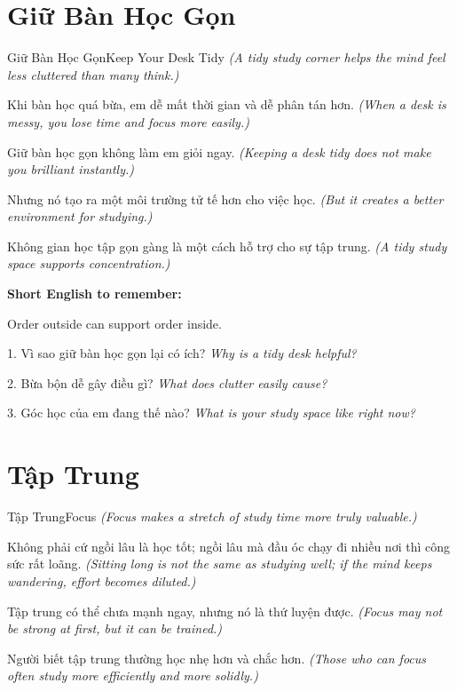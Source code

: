 \section{Giữ Bàn Học Gọn}
\begin{truyen}{Giữ Bàn Học Gọn}{Keep Your Desk Tidy}
\textit{(A tidy study corner helps the mind feel less cluttered than many think.)}

Khi bàn học quá bừa, em dễ mất thời gian và dễ phân tán hơn.
\textit{(When a desk is messy, you lose time and focus more easily.)}

Giữ bàn học gọn không làm em giỏi ngay.
\textit{(Keeping a desk tidy does not make you brilliant instantly.)}

Nhưng nó tạo ra một môi trường tử tế hơn cho việc học.
\textit{(But it creates a better environment for studying.)}
\end{truyen}

\begin{baihoc}
Không gian học tập gọn gàng là một cách hỗ trợ cho sự tập trung.
\textit{(A tidy study space supports concentration.)}
\end{baihoc}

\begin{ghinhoanh}
\textbf{Short English to remember:}

Order outside can support order inside.

\end{ghinhoanh}

\begin{tuhocnhanh}
1. Vì sao giữ bàn học gọn lại có ích? \textit{Why is a tidy desk helpful?}

2. Bừa bộn dễ gây điều gì? \textit{What does clutter easily cause?}

3. Góc học của em đang thế nào? \textit{What is your study space like right now?}
\end{tuhocnhanh}
\ngancach

\section{Tập Trung}
\begin{truyen}{Tập Trung}{Focus}
\textit{(Focus makes a stretch of study time more truly valuable.)}

Không phải cứ ngồi lâu là học tốt; ngồi lâu mà đầu óc chạy đi nhiều nơi thì công sức rất loãng.
\textit{(Sitting long is not the same as studying well; if the mind keeps wandering, effort becomes diluted.)}

Tập trung có thể chưa mạnh ngay, nhưng nó là thứ luyện được.
\textit{(Focus may not be strong at first, but it can be trained.)}

Người biết tập trung thường học nhẹ hơn và chắc hơn.
\textit{(Those who can focus often study more efficiently and more solidly.)}
\end{truyen}

